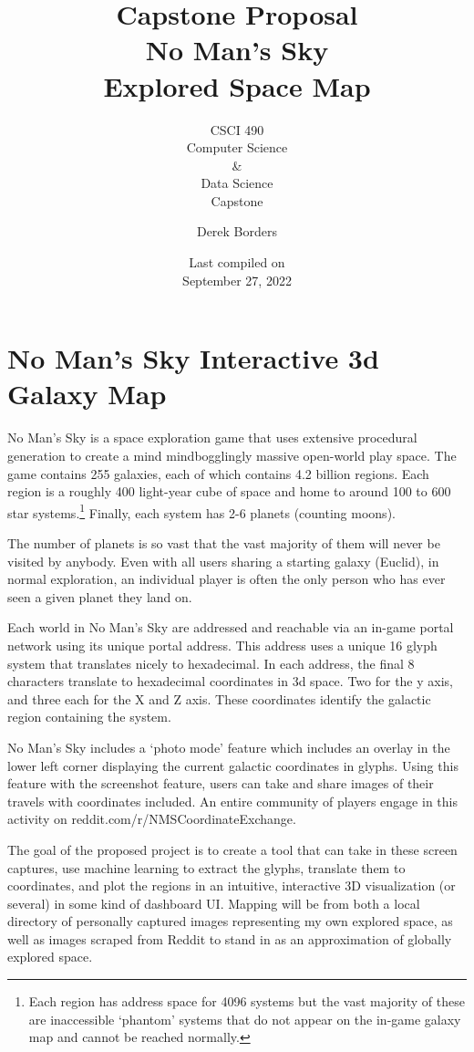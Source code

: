 \documentclass[
]{article}
\title{\vspace{1in}Capstone Proposal\\
\vspace{.25in}No Man's Sky\\
Explored Space Map\\
\vspace{.5in}}
\subtitle{CSCI 490\\
Computer Science\\
\&\\
Data Science\\
Capstone \vspace{.5in}}
\author{Derek Borders\\
\vspace{1in}}
\date{Last compiled on\\
September 27, 2022}
\begin{document}
\maketitle

\pagebreak

\hypertarget{no-mans-sky-interactive-3d-galaxy-map}{%
\section{No Man's Sky Interactive 3d Galaxy
Map}\label{no-mans-sky-interactive-3d-galaxy-map}}

No Man's Sky is a space exploration game that uses extensive procedural
generation to create a mind mindbogglingly massive open-world play
space. The game contains 255 galaxies, each of which contains 4.2
billion regions. Each region is a roughly 400 light-year cube of space
and home to around 100 to 600 star systems.\footnote{Each region has
  address space for 4096 systems but the vast majority of these are
  inaccessible `phantom' systems that do not appear on the in-game
  galaxy map and cannot be reached normally.} Finally, each system has
2-6 planets (counting moons).

The number of planets is so vast that the vast majority of them will
never be visited by anybody. Even with all users sharing a starting
galaxy (Euclid), in normal exploration, an individual player is often
the only person who has ever seen a given planet they land on.

Each world in No Man's Sky are addressed and reachable via an in-game
portal network using its unique portal address. This address uses a
unique 16 glyph system that translates nicely to hexadecimal. In each
address, the final 8 characters translate to hexadecimal coordinates in
3d space. Two for the y axis, and three each for the X and Z axis. These
coordinates identify the galactic region containing the system.

No Man's Sky includes a `photo mode' feature which includes an overlay
in the lower left corner displaying the current galactic coordinates in
glyphs. Using this feature with the screenshot feature, users can take
and share images of their travels with coordinates included. An entire
community of players engage in this activity on
reddit.com/r/NMSCoordinateExchange.

The goal of the proposed project is to create a tool that can take in
these screen captures, use machine learning to extract the glyphs,
translate them to coordinates, and plot the regions in an intuitive,
interactive 3D visualization (or several) in some kind of dashboard UI.
Mapping will be from both a local directory of personally captured
images representing my own explored space, as well as images scraped
from Reddit to stand in as an approximation of globally explored space.
\end{document}
